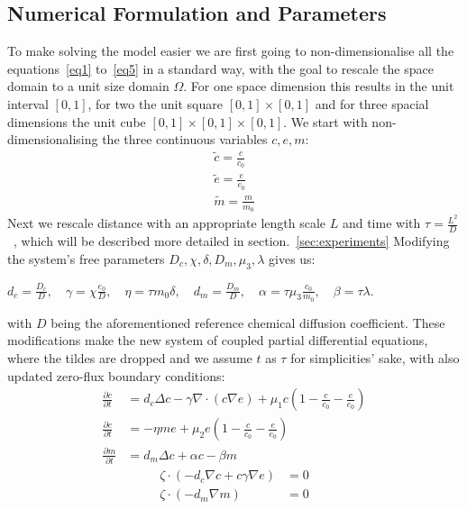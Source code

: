 \subsection{Numerical Formulation and Parameters}

To make solving the model easier we are first going to non-dimensionalise all the equations~\ref{eq1} to~\ref{eq5} in a standard way, with the goal to rescale the space domain to a unit size domain $\Omega$. For one space dimension this results in the unit interval $[0,1]$, for two the unit square $[0,1] \times [0,1]$ and for three spacial dimensions the unit cube $[0,1] \times [0,1] \times [0,1]$. \newline
We start with non-dimensionalising the three continuous variables $c,e,m$:
\begin{align*}
    \tilde{c} = \frac{c}{c_0} \\
    \tilde{e} = \frac{e}{e_0} \\
    \tilde{m} = \frac{m}{m_0}  
\end{align*}
Next we rescale distance with an appropriate length scale $L$ and time with $\tau = \frac{L^2}{D}$~\cite{anderson_mathematical_2000}, which will be described more detailed in section.~\ref{sec:experiments}\newline
Modifying the system's free parameters $D_c, \chi, \delta, D_m, \mu_3, \lambda$ gives us:  
\begin{center}
    $d_c = \frac{D_c}{D},\quad \gamma = \chi \frac{e_0}{D},\quad \eta = \tau m_0 \delta,\quad d_m = \frac{D_m}{D},\quad \alpha = \tau \mu_3 \frac{c_0}{m_0},\quad \beta = \tau \lambda$.
\end{center} 
with $D$ being the aforementioned reference chemical diffusion coefficient.\newline 
These modifications make the new system of coupled partial differential equations, where the tildes are dropped and we assume $t$ as $\tau$ for simplicities' sake, with also updated zero-flux boundary conditions:
\begin{align}
	\frac{\partial c}{\partial t} &= d_c \Delta c - \gamma \nabla \cdot (c\nabla e)  + \mu_1 c\left(1-\frac{c}{c_0}-\frac{e}{e_0}\right)\label{eq:6}\\
	\frac{\partial e}{\partial t} &= -\eta m e  + \mu_2 e\left(1-\frac{c}{c_0}-\frac{e}{e_0}\right)\label{eq:7}\\
	\frac{\partial m}{\partial t} &= d_m \Delta c + \alpha c - \beta m\label{eq:8}
\end{align}
\begin{align}
	\zeta \cdot (-d_c \nabla c + c \gamma \nabla e) &= 0\label{eq:9}\\
	\zeta \cdot (-d_m\nabla m ) &= 0\label{eq:10}
\end{align}
